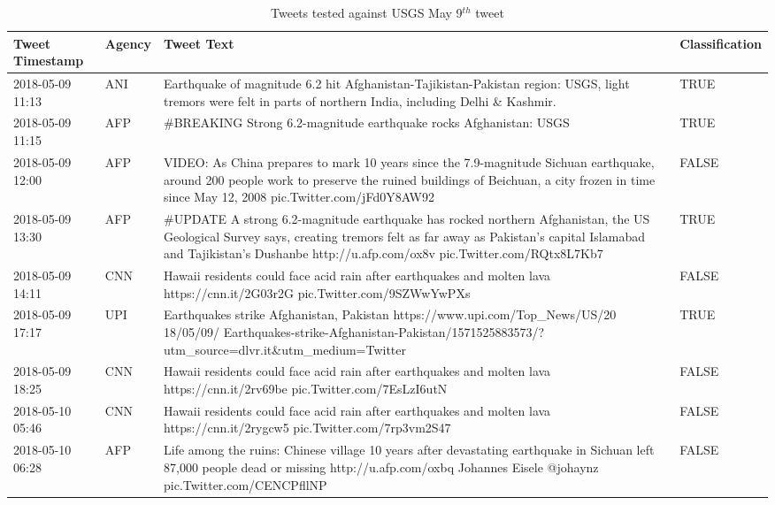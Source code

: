\begin{table}
    \caption{Tweets tested against USGS May 9$^{th}$ tweet}
    \label{tab:sample_tweets}
    \bigskip
    \centering\small\setlength\tabcolsep{2pt}
        \hspace*{-2cm}\begin{tabular}{ p{4cm} p{2cm} p{16cm} p{3cm} }
            \toprule
            \textbf{Tweet Timestamp} & \textbf{Agency} & \textbf{Tweet Text} & \textbf{Classification} \\
            \midrule
2018-05-09 11:13 &  ANI & Earthquake of magnitude 6.2 hit Afghanistan-Tajikistan-Pakistan region: USGS, light tremors were felt in parts of northern India, including Delhi \& Kashmir. & TRUE \\
2018-05-09 11:15 &  AFP & \#BREAKING Strong 6.2-magnitude earthquake rocks Afghanistan: USGS & TRUE \\
2018-05-09 12:00 &  AFP & VIDEO: As China prepares to mark 10 years since the 7.9-magnitude Sichuan earthquake, around 200 people work to preserve the ruined buildings of Beichuan, a city frozen in time since May 12, 2008 pic.Twitter.com/jFd0Y8AW92 & FALSE \\
2018-05-09 13:30 &  AFP & \#UPDATE A strong 6.2-magnitude earthquake has rocked northern Afghanistan, the US Geological Survey says, creating tremors felt as far away as Pakistan's capital Islamabad and Tajikistan's Dushanbe http://u.afp.com/ox8v pic.Twitter.com/RQtx8L7Kb7 & TRUE \\
2018-05-09 14:11 &  CNN & Hawaii residents could face acid rain after earthquakes and molten lava https://cnn.it/2G03r2G pic.Twitter.com/9SZWwYwPXs & FALSE \\
2018-05-09 17:17 &  UPI & Earthquakes strike Afghanistan, Pakistan https://www.upi.com/Top\_News/US/20 18/05/09/ Earthquakes-strike-Afghanistan-Pakistan/1571525883573/?utm\_source=dlvr.it\&utm\_medium=Twitter & TRUE \\
2018-05-09 18:25 &  CNN & Hawaii residents could face acid rain after earthquakes and molten lava https://cnn.it/2rv69be pic.Twitter.com/7EsLzI6utN & FALSE \\
2018-05-10 05:46 &  CNN & Hawaii residents could face acid rain after earthquakes and molten lava https://cnn.it/2rygcw5 pic.Twitter.com/7rp3vm2S47 & FALSE \\
2018-05-10 06:28 &  AFP & Life among the ruins: Chinese village 10 years after devastating earthquake in Sichuan left 87,000 people dead or missing http://u.afp.com/oxbq Johannes Eisele @johaynz pic.Twitter.com/CENCPfllNP & FALSE \\

\end{tabular}
\end{table}

